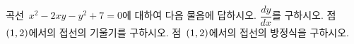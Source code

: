 곡선~$x^2-2xy-y^2+7=0$에 대하여 다음 물음에 답하시오.
 $\dfrac{dy}{dx}$를 구하시오.
 점~$(1{,}\mkern3mu\mathopen{}2)$에서의 접선의 기울기를 구하시오.
 점~$(1{,}\mkern3mu\mathopen{}2)$에서의 접선의 방정식을 구하시오.
